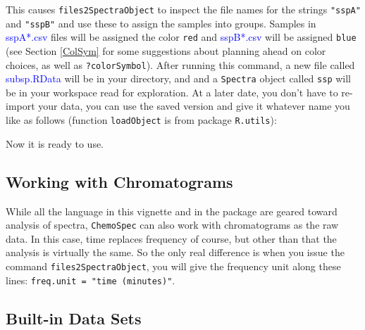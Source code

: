 \documentclass[letter,10pt,twocolumn,twoside,printwatermark=false]{pinp}
\begin{document}
This causes \texttt{files2SpectraObject} to inspect the file names for
the strings \texttt{"sspA"} and \texttt{"sspB"} and use these to assign
the samples into groups. Samples in \textcolor{blue}{sspA*.csv} files
will be assigned the color \texttt{red} and \textcolor{blue}{sspB*.csv}
will be assigned \texttt{blue} (see Section \ref{ColSym} for some
suggestions about planning ahead on color choices, as well as
\texttt{?colorSymbol}). After running this command, a new file called
\textcolor{blue}{subsp.RData} will be in your directory, and and a
\texttt{Spectra} object called \texttt{ssp} will be in your workspace
read for exploration. At a later date, you don't have to re-import your
data, you can use the saved version and give it whatever name you like
as follows (function \texttt{loadObject} is from package
\texttt{R.utils}):

\begin{Shaded}
\begin{Highlighting}[]
\StringTok{ }\NormalTok{(}\NormalTok{)}
\end{Highlighting}
\end{Shaded}

Now it is ready to use.

\hypertarget{working-with-chromatograms}{%
\subsection{Working with
Chromatograms}\label{working-with-chromatograms}}

While all the language in this vignette and in the package are geared
toward analysis of spectra, \texttt{ChemoSpec} can also work with
chromatograms as the raw data. In this case, time replaces frequency of
course, but other than that the analysis is virtually the same. So the
only real difference is when you issue the command
\texttt{files2SpectraObject}, you will give the frequency unit along
these lines: \texttt{freq.unit = "time (minutes)"}.

\hypertarget{built-in-data-sets}{%
\subsection{Built-in Data Sets}\label{built-in-data-sets}}
\end{document}
